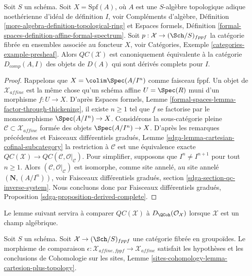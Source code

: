 \begin{proposition}
\label{proposition-QC-derived-complete}
Soit $S$ un schéma. Soit $X = \text{Spf}(A)$, où $A$ est une
$S$-algèbre topologique adique noethérienne d'idéal de définition $I$, voir
Compléments d'algèbre, Définition \ref{more-algebra-definition-topological-ring}
et Espaces formels, Définition
\ref{formal-spaces-definition-affine-formal-spectrum}.
Soit $p : \mathcal{X} \to (\Sch/S)_{fppf}$
la catégorie fibrée en ensembles associée au foncteur $X$, voir
Catégories, Exemple \ref{categories-example-presheaf}.
Alors $\mathit{QC}(\mathcal{X})$ est canoniquement équivalente à la
catégorie $D_{comp}(A, I)$ des objets de $D(A)$ qui sont
dérivés complets pour $I$.
\end{proposition}

\begin{proof}
Rappelons que $X = \colim \Spec(A/I^n)$ comme faisceau fppf.
Un objet de $\mathcal{X}_{affine}$ est la même chose
qu'un schéma affine $U = \Spec(R)$ muni d'un morphisme $f : U \to X$.
D'après Espaces formels, Lemme \ref{formal-spaces-lemma-factor-through-thickening},
il existe $n \geq 1$ tel que
$f$ se factorise par le monomorphisme $\Spec(A/I^n) \to X$.
Considérons la sous-catégorie pleine
$\mathcal{C} \subset \mathcal{X}_{affine}$ formée des
objets $\Spec(A/I^n) \to X$.
D'après les remarques précédentes et Faisceaux différentiels gradués, Lemme
\ref{sdga-lemma-cartesian-cofinal-subcategory}
la restriction à $\mathcal{C}$ est une équivalence exacte
$\mathit{QC}(\mathcal{X}) \to
\mathit{QC}(\mathcal{C}, \mathcal{O}|_\mathcal{C})$.
Pour simplifier, supposons que
$I^n \not = I^{n + 1}$ pour tout $n \geq 1$.
Alors $(\mathcal{C}, \mathcal{O}|_\mathcal{C})$ est isomorphe,
comme site annelé, au site annelé $(\mathbf{N}, (A/I^n))$, voir
Faisceaux différentiels gradués, section
\ref{sdga-section-qc-inverse-system}.
Nous concluons donc par Faisceaux différentiels gradués, Proposition
\ref{sdga-proposition-derived-complete}.
\end{proof}

\noindent
Le lemme suivant servira à comparer $\mathit{QC}(\mathcal{X})$
à $D_\QCoh(\mathcal{O}_\mathcal{X})$ lorsque $\mathcal{X}$ est un champ algébrique.

\begin{lemma}
\label{lemma-QC-compare-fppf}
Soit $S$ un schéma. Soit $\mathcal{X} \to (\Sch/S)_{fppf}$ une catégorie
fibrée en groupoïdes. Le morphisme de comparaison
$\epsilon : \mathcal{X}_{affine, fppf} \to \mathcal{X}_{affine}$
satisfait les hypothèses et les conclusions de Cohomologie sur les sites, Lemme
\ref{sites-cohomology-lemma-cartesion-plus-topology}.
\end{lemma}

